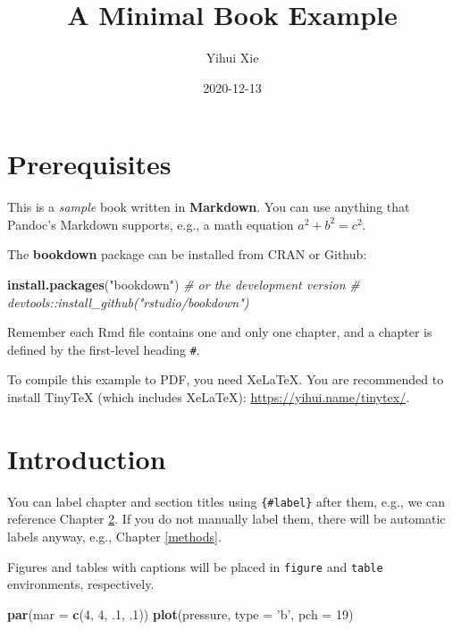 \documentclass[
]{book}
\title{A Minimal Book Example}
\author{Yihui Xie}
\date{2020-12-13}
\newenvironment{Shaded}{\begin{snugshade}}{\end{snugshade}}
\newcommand{\CommentTok}[1]{\textcolor[rgb]{0.56,0.35,0.01}{\textit{#1}}}
\newcommand{\DataTypeTok}[1]{\textcolor[rgb]{0.13,0.29,0.53}{#1}}
\newcommand{\DecValTok}[1]{\textcolor[rgb]{0.00,0.00,0.81}{#1}}
\newcommand{\FloatTok}[1]{\textcolor[rgb]{0.00,0.00,0.81}{#1}}
\newcommand{\KeywordTok}[1]{\textcolor[rgb]{0.13,0.29,0.53}{\textbf{#1}}}
\newcommand{\NormalTok}[1]{#1}
\newcommand{\StringTok}[1]{\textcolor[rgb]{0.31,0.60,0.02}{#1}}
\begin{document}
\maketitle

{
\setcounter{tocdepth}{1}
\tableofcontents
}
\hypertarget{prerequisites}{%
\chapter{Prerequisites}\label{prerequisites}}

This is a \emph{sample} book written in \textbf{Markdown}. You can use anything that Pandoc's Markdown supports, e.g., a math equation \(a^2 + b^2 = c^2\).

The \textbf{bookdown} package can be installed from CRAN or Github:

\begin{Shaded}
\begin{Highlighting}[]
\KeywordTok{install.packages}\NormalTok{(}\StringTok{"bookdown"}\NormalTok{)}
\CommentTok{# or the development version}
\CommentTok{# devtools::install_github("rstudio/bookdown")}
\end{Highlighting}
\end{Shaded}

Remember each Rmd file contains one and only one chapter, and a chapter is defined by the first-level heading \texttt{\#}.

To compile this example to PDF, you need XeLaTeX. You are recommended to install TinyTeX (which includes XeLaTeX): \url{https://yihui.name/tinytex/}.

\hypertarget{intro}{%
\chapter{Introduction}\label{intro}}

You can label chapter and section titles using \texttt{\{\#label\}} after them, e.g., we can reference Chapter \ref{intro}. If you do not manually label them, there will be automatic labels anyway, e.g., Chapter \ref{methods}.

Figures and tables with captions will be placed in \texttt{figure} and \texttt{table} environments, respectively.

\begin{Shaded}
\begin{Highlighting}[]
\KeywordTok{par}\NormalTok{(}\DataTypeTok{mar =} \KeywordTok{c}\NormalTok{(}\DecValTok{4}\NormalTok{, }\DecValTok{4}\NormalTok{, }\FloatTok{.1}\NormalTok{, }\FloatTok{.1}\NormalTok{))}
\KeywordTok{plot}\NormalTok{(pressure, }\DataTypeTok{type =} \StringTok{'b'}\NormalTok{, }\DataTypeTok{pch =} \DecValTok{19}\NormalTok{)}
\end{Highlighting}
\end{Shaded}
\end{document}
